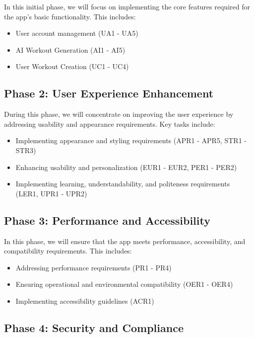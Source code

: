 \documentclass[12pt]{article}
\begin{document}
In this initial phase, we will focus on implementing the core features required for the app's basic functionality. This includes:

\begin{itemize}
    \item User account management (UA1 - UA5)
    \item AI Workout Generation (AI1 - AI5)
    \item User Workout Creation (UC1 - UC4)
\end{itemize}

\subsection{Phase 2: User Experience Enhancement}

During this phase, we will concentrate on improving the user experience by addressing usability and appearance requirements. Key tasks include:

\begin{itemize}
\item Implementing appearance and styling requirements (APR1 - APR5, STR1 - STR3)
\item Enhancing usability and personalization (EUR1 - EUR2, PER1 - PER2)
\item Implementing learning, understandability, and politeness requirements (LER1, UPR1 - UPR2)
\end{itemize}

\subsection{Phase 3: Performance and Accessibility}

In this phase, we will ensure that the app meets performance, accessibility, and compatibility requirements. This includes:

\begin{itemize}
\item Addressing performance requirements (PR1 - PR4)
\item Ensuring operational and environmental compatibility (OER1 - OER4)
\item Implementing accessibility guidelines (ACR1)
\end{itemize}

\subsection{Phase 4: Security and Compliance}
\end{document}
